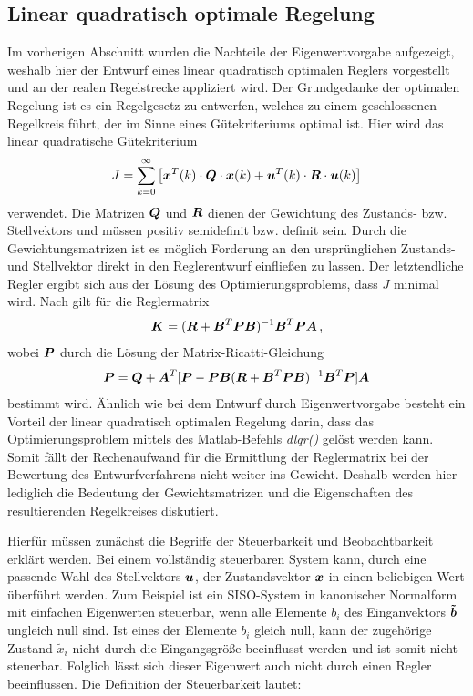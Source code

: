 \subsection{Linear quadratisch optimale Regelung}
Im vorherigen Abschnitt wurden die Nachteile der Eigenwertvorgabe aufgezeigt, weshalb hier der Entwurf eines linear quadratisch optimalen Reglers vorgestellt und an der realen Regelstrecke appliziert wird. Der Grundgedanke der optimalen Regelung ist es ein Regelgesetz zu entwerfen, welches zu einem geschlossenen Regelkreis führt, der im Sinne eines Gütekriteriums optimal ist. Hier wird das linear quadratische Gütekriterium
\begin{equation}
J = \sum^{\infty}_{k=0} \left[\boldsymbol{x}^T(k)\cdot \boldsymbol{Q} \cdot \boldsymbol{x}(k) + \boldsymbol{u}^T(k)\cdot \boldsymbol{R}\cdot \boldsymbol{u}(k)\right]
\end{equation}
verwendet. Die Matrizen $\boldsymbol{Q}$ und $\boldsymbol{R}$ dienen der Gewichtung des Zustands- bzw. Stellvektors und müssen positiv semidefinit bzw. definit sein. Durch die Gewichtungsmatrizen ist es möglich Forderung an den ursprünglichen Zustands- und Stellvektor direkt in den Reglerentwurf einfließen zu lassen. Der letztendliche Regler ergibt sich aus der Lösung des Optimierungsproblems, dass $J$ minimal wird. Nach \cite[S. 177]{Ludyk} gilt für die Reglermatrix
\begin{equation}
\boldsymbol{K} = (\boldsymbol{R}+\boldsymbol{B}^T\boldsymbol{P}\boldsymbol{B})^{-1}\boldsymbol{B}^T\boldsymbol{P}\boldsymbol{A}\,,
\end{equation}
wobei $\boldsymbol{P}$ durch die Lösung der Matrix-Ricatti-Gleichung 
\begin{equation}
\boldsymbol{P} = \boldsymbol{Q}+\boldsymbol{A}^T[\boldsymbol{P}-\boldsymbol{P}\boldsymbol{B}(\boldsymbol{R}+\boldsymbol{B}^T\boldsymbol{P}\boldsymbol{B})^{-1}\boldsymbol{B}^T\boldsymbol{P}]\boldsymbol{A}
\end{equation}
bestimmt wird. Ähnlich wie bei dem Entwurf durch Eigenwertvorgabe besteht ein Vorteil der linear quadratisch optimalen Regelung darin, dass das Optimierungsproblem mittels des Matlab-Befehls \textit{dlqr()} gelöst werden kann. Somit fällt der Rechenaufwand für die Ermittlung der Reglermatrix bei der Bewertung des Entwurfverfahrens nicht weiter ins Gewicht. Deshalb werden hier lediglich die Bedeutung der Gewichtsmatrizen und die Eigenschaften des resultierenden Regelkreises diskutiert.

Hierfür müssen zunächst die Begriffe der Steuerbarkeit und Beobachtbarkeit erklärt werden. Bei einem vollständig steuerbaren System kann, durch eine passende Wahl des Stellvektors $\boldsymbol{u}$, der Zustandsvektor $\boldsymbol{x}$ in einen beliebigen Wert überführt werden. Zum Beispiel ist ein SISO-System in kanonischer Normalform mit einfachen Eigenwerten steuerbar, wenn alle Elemente $b_{i}$ des Einganvektors $\boldsymbol{\tilde{b}}$ ungleich null sind. Ist eines der Elemente $b_{i}$ gleich null, kann der zugehörige Zustand $\tilde{x}_i$ nicht durch die Eingangsgröße beeinflusst werden und ist somit nicht steuerbar. Folglich lässt sich dieser Eigenwert auch nicht durch einen Regler beeinflussen. Die Definition der Steuerbarkeit lautet:

